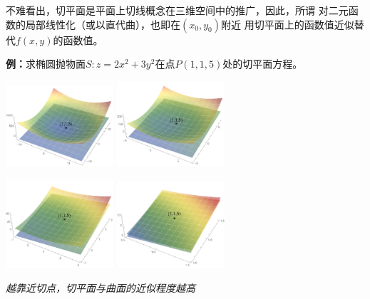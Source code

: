 不难看出，切平面是平面上切线概念在三维空间中的推广，因此，所谓
对二元函数的局部线性化（或以直代曲），也即在$(x_0,y_0)$附近
用切平面上的函数值近似替代$f(x,y)$的函数值。

{\bf 例：}求椭圆抛物面$S:z=2x^2+3y^2$在点$P(1,1,5)$处的切平面方程。

\begin{center}
	\includegraphics[width=0.3\textwidth]{./images/ch10/3DSurfaceDeri-1-1.pdf}
	\quad\includegraphics[width=0.3\textwidth]{./images/ch10/3DSurfaceDeri-1-2.pdf}
	
	\includegraphics[width=0.3\textwidth]{./images/ch10/3DSurfaceDeri-1-3.pdf}
	\quad\includegraphics[width=0.3\textwidth]{./images/ch10/3DSurfaceDeri-1-4.pdf}
	
	{\it 越靠近切点，切平面与曲面的近似程度越高}
\end{center}

